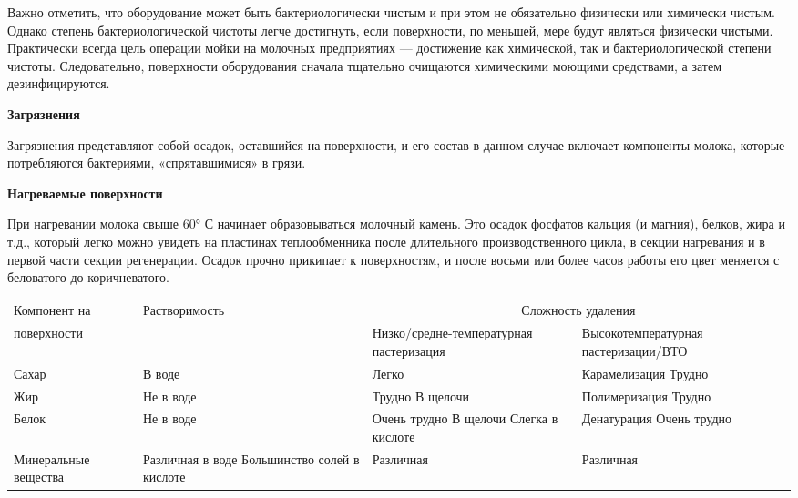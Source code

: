 \documentclass[a4paper,12pt,oneside]{extarticle}
\begin{document}
	\begin{flushleft}
		Важно отметить, что оборудование может быть бактериологически чистым и при этом не
		обязательно физически или химически чистым. Однако степень бактериологической чистоты
		легче достигнуть, если поверхности, по меньшей, мере будут являться физически чистыми.
		Практически всегда цель операции мойки на молочных предприятиях — достижение как
		химической, так и бактериологической степени чистоты. Следовательно, поверхности
		оборудования сначала тщательно очищаются химическими моющими средствами, а затем
		дезинфицируются.
	\end{flushleft}
	
	\begin{flushleft}
		\bfseries Загрязнения
	\end{flushleft}
	
	\begin{flushleft}
		Загрязнения представляют собой осадок, оставшийся на поверхности, и его состав в данном случае включает компоненты молока, которые потребляются бактериями, «спрятавшимися» в грязи.
	\end{flushleft}
	
	\begin{flushleft}
		\bfseries Нагреваемые поверхности
	\end{flushleft}
	
	\begin{flushleft}
		При нагревании молока свыше 60° С начинает образовываться молочный камень.
		Это осадок фосфатов кальция (и магния), белков, жира и т.д., который легко можно увидеть на пластинах теплообменника после длительного производственного цикла, в секции нагревания и в первой части секции регенерации. Осадок прочно прикипает к поверхностям, и после восьми или более часов работы его цвет меняется с беловатого до коричневатого.
	\end{flushleft}
	
	
	\begin{tabular}{|p{2.7cm}| p{3cm}| p{4cm} |p{4cm}|}
		\hline
		Компонент на & Растворимость & \multicolumn{2}{c|}{ Сложность удаления} \\
		
		поверхности&  & Низко/средне-температурная пастеризация & Высокотемпературная пастеризации/ВТО \\
		\hline
		Сахар & В воде & Легко & Карамелизация Трудно \\
		\hline
		Жир & Не в воде & Трудно В щелочи & Полимеризация Трудно \\
		\hline
		Белок & Не в воде & Очень трудно В щелочи Слегка в кислоте & Денатурация Очень трудно \\
		\hline
		Минеральные вещества & Различная в воде Большинство солей в кислоте & Различная & Различная \\
		\hline
	\end{tabular}
	
\end{document}
